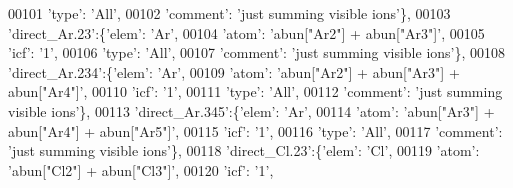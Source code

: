 \begin{DoxyCode}
00101                                        \textcolor{stringliteral}{'type'}: \textcolor{stringliteral}{'All'},
00102                                        \textcolor{stringliteral}{'comment'}: \textcolor{stringliteral}{'just summing visible ions'}\},
00103                          \textcolor{stringliteral}{'direct\_Ar.23'}:\{\textcolor{stringliteral}{'elem'}: \textcolor{stringliteral}{'Ar'},
00104                                        \textcolor{stringliteral}{'atom'}: \textcolor{stringliteral}{'abun["Ar2"] + abun["Ar3"]'},
00105                                        \textcolor{stringliteral}{'icf'}: \textcolor{stringliteral}{'1'},
00106                                        \textcolor{stringliteral}{'type'}: \textcolor{stringliteral}{'All'},
00107                                        \textcolor{stringliteral}{'comment'}: \textcolor{stringliteral}{'just summing visible ions'}\},
00108                          \textcolor{stringliteral}{'direct\_Ar.234'}:\{\textcolor{stringliteral}{'elem'}: \textcolor{stringliteral}{'Ar'},
00109                                        \textcolor{stringliteral}{'atom'}: \textcolor{stringliteral}{'abun["Ar2"] + abun["Ar3"] + abun["Ar4"]'},
00110                                        \textcolor{stringliteral}{'icf'}: \textcolor{stringliteral}{'1'},
00111                                        \textcolor{stringliteral}{'type'}: \textcolor{stringliteral}{'All'},
00112                                        \textcolor{stringliteral}{'comment'}: \textcolor{stringliteral}{'just summing visible ions'}\},
00113                          \textcolor{stringliteral}{'direct\_Ar.345'}:\{\textcolor{stringliteral}{'elem'}: \textcolor{stringliteral}{'Ar'},
00114                                        \textcolor{stringliteral}{'atom'}: \textcolor{stringliteral}{'abun["Ar3"] + abun["Ar4"] + abun["Ar5"]'},
00115                                        \textcolor{stringliteral}{'icf'}: \textcolor{stringliteral}{'1'},
00116                                        \textcolor{stringliteral}{'type'}: \textcolor{stringliteral}{'All'},
00117                                        \textcolor{stringliteral}{'comment'}: \textcolor{stringliteral}{'just summing visible ions'}\},
00118                          \textcolor{stringliteral}{'direct\_Cl.23'}:\{\textcolor{stringliteral}{'elem'}: \textcolor{stringliteral}{'Cl'},
00119                                        \textcolor{stringliteral}{'atom'}: \textcolor{stringliteral}{'abun["Cl2"] + abun["Cl3"]'},
00120                                        \textcolor{stringliteral}{'icf'}: \textcolor{stringliteral}{'1'},

\end{DoxyCode}
